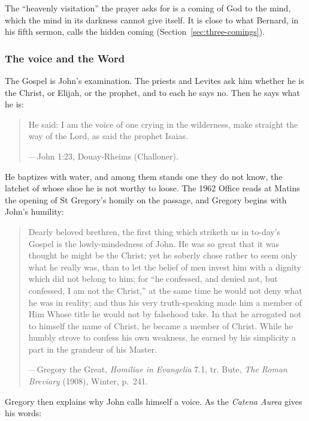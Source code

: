 The ``heavenly visitation'' the prayer asks for is a coming of God to the mind, which the
mind in its darkness cannot give itself. It is close to what Bernard, in his fifth sermon, calls
the hidden coming (Section~\ref{sec:three-comings}).

\subsubsection{The voice and the Word}

The Gospel is John's examination. The priests and Levites ask him whether he is the Christ, or
Elijah, or the prophet, and to each he says no. Then he says what he is:

\begin{quote}
He said: I am the voice of one crying in the wilderness, make straight the way of the Lord, as
said the prophet Isaias.\par
{\smallskip\noindent\small ---John 1:23, Douay-Rheims (Challoner).\par}
\end{quote}

\noindent He baptizes with water, and among them stands one they do not know, the latchet of whose
shoe he is not worthy to loose. The 1962 Office
reads at Matins the opening of St Gregory's homily on the passage, and Gregory begins with
John's humility:

\begin{quote}
Dearly beloved brethren, the first thing which striketh us in to-day's Gospel is the
lowly-mindedness of John. He was so great that it was thought he might be the Christ; yet he
soberly chose rather to seem only what he really was, than to let the belief of men invest him
with a dignity which did not belong to him; for ``he confessed, and denied not, but confessed, I
am not the Christ,'' at the same time he would not deny what he was in reality; and thus his very
truth-speaking made him a member of Him Whose title he would not by falsehood take. In that he
arrogated not to himself the name of Christ, he became a member of Christ. While he humbly strove
to confess his own weakness, he earned by his simplicity a part in the grandeur of his
Master.\par
{\smallskip\noindent\small ---Gregory the Great, \textit{Homiliae in Evangelia} 7.1, tr. Bute,
\textit{The Roman Breviary} (1908), Winter, p.~241.\par}
\end{quote}

Gregory then explains why John calls himself a voice. As the \textit{Catena Aurea} gives his
words:

